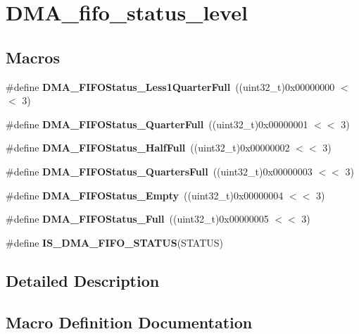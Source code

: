 \section{D\+M\+A\+\_\+fifo\+\_\+status\+\_\+level}
\label{group__DMA__fifo__status__level}
\subsection*{Macros}
\begin{DoxyCompactItemize}
\item 
\#define \textbf{ D\+M\+A\+\_\+\+F\+I\+F\+O\+Status\+\_\+\+Less1\+Quarter\+Full}~((uint32\+\_\+t)0x00000000 $<$$<$ 3)
\item 
\#define \textbf{ D\+M\+A\+\_\+\+F\+I\+F\+O\+Status\+\_\+Quarter\+Full}~((uint32\+\_\+t)0x00000001 $<$$<$ 3)
\item 
\#define \textbf{ D\+M\+A\+\_\+\+F\+I\+F\+O\+Status\+\_\+\+Half\+Full}~((uint32\+\_\+t)0x00000002 $<$$<$ 3)
\item 
\#define \textbf{ D\+M\+A\+\_\+\+F\+I\+F\+O\+Status\+\_\+Quarters\+Full}~((uint32\+\_\+t)0x00000003 $<$$<$ 3)
\item 
\#define \textbf{ D\+M\+A\+\_\+\+F\+I\+F\+O\+Status\+\_\+\+Empty}~((uint32\+\_\+t)0x00000004 $<$$<$ 3)
\item 
\#define \textbf{ D\+M\+A\+\_\+\+F\+I\+F\+O\+Status\+\_\+\+Full}~((uint32\+\_\+t)0x00000005 $<$$<$ 3)
\item 
\#define \textbf{ I\+S\+\_\+\+D\+M\+A\+\_\+\+F\+I\+F\+O\+\_\+\+S\+T\+A\+T\+US}(S\+T\+A\+T\+US)
\end{DoxyCompactItemize}


\subsection{Detailed Description}


\subsection{Macro Definition Documentation}
\mbox{\label{group__DMA__fifo__status__level_ga258d41ce51005eea1c5a69fcf07d8e42}} 
